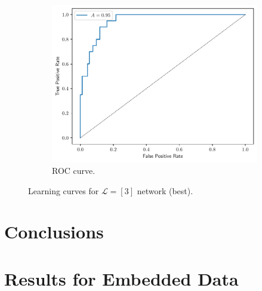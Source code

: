 \documentclass[conference]{IEEEtran}
\theoremstyle{definition}
\theoremstyle{remark}
\theoremstyle{remark}
\begin{document}
\begin{figure}
\begin{subfigure}[b]{0.32\textwidth}
        \includegraphics[width=\textwidth]{figs/3-0.9-roc.pdf}
        \caption{ROC curve.}
    \end{subfigure}
    \caption{Learning curves for $\mathcal{L}=[3]$ network (best).}
    \label{fig:NN-best}
\end{figure}

\section{Conclusions}\label{sec:conc}

\printbibliography

\appendices

\section{Results for Embedded Data}
\end{document}
